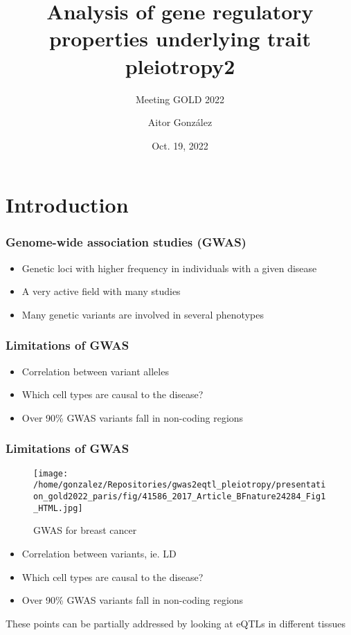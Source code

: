 \documentclass{beamer}
\title{Analysis of gene regulatory properties underlying trait pleiotropy2}
\subtitle{Meeting GOLD 2022}
\author{Aitor Gonz\'alez}
\institute{Aix Marseille Univ, INSERM, TAGC}
\date{Oct. 19, 2022}
\begin{document}
\begin{frame}

\titlepage

\end{frame}

\section{Introduction} %

\begin{frame}
\frametitle{Genome-wide association studies (GWAS)}

\begin{itemize}
\item Genetic loci with higher frequency in individuals with a given disease
\item A very active field with many studies
\item Many genetic variants are involved in several phenotypes
\end{itemize}

\end{frame}

\begin{frame}
\frametitle{Limitations of GWAS}

\begin{itemize}
\item Correlation between variant alleles
\item Which cell types are causal to the disease?
\item Over 90\% GWAS variants fall in non-coding regions
\end{itemize}

\end{frame}

\begin{frame}
\frametitle{Limitations of GWAS}

\begin{figure}[!]
\texttt{[image: /home/gonzalez/Repositories/gwas2eqtl\_pleiotropy/presentation\_gold2022\_paris/fig/41586\_2017\_Article\_BFnature24284\_Fig1\_HTML.jpg]}
\caption{GWAS for breast cancer}
\end{figure}

\begin{itemize}
\item Correlation between variants, ie. LD
\item Which cell types are causal to the disease?
\item Over 90\% GWAS variants fall in non-coding regions
\end{itemize}
%
\vfill
%
These points can be partially addressed by looking at eQTLs in different tissues

\let\thefootnote\relax{}
\end{frame}
\end{document}
